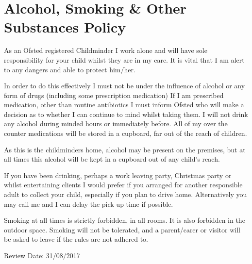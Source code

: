 
\section{Alcohol, Smoking \& Other Substances Policy}

As an Ofsted registered Childminder I work alone and will have sole
responsibility for your child whilst they are in my care. It is vital
that I am alert to any dangers and able to protect him/her.

In order to do this effectively I must not be under the influence of
alcohol or any form of drugs (including some prescription medication) If
I am prescribed medication, other than routine antibiotics I must inform
Ofsted who will make a decision as to whether I can continue to mind
whilst taking them. I will not drink any alcohol during minded hours or
immediately before. All of my over the counter medications will be
stored in a cupboard, far out of the reach of children.

As this is the childminders home, alcohol may be present on the
premises, but at all times this alcohol will be kept in a cupboard out
of any child's reach.

If you have been drinking, perhaps a work leaving party, Christmas party
or whilst entertaining clients I would prefer if you arranged for
another responsible adult to collect your child, especially if you plan
to drive home. Alternatively you may call me and I can delay the pick up
time if possible.

Smoking at all times is strictly forbidden, in all rooms. It is also
forbidden in the outdoor space. Smoking will not be tolerated, and a
parent/carer or visitor will be asked to leave if the rules are not
adhered to.

Review Date: 31/08/2017



